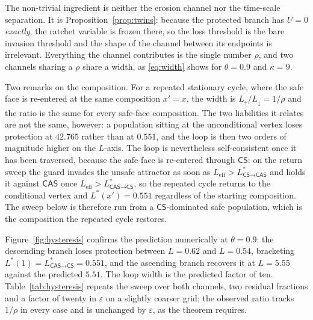 \documentclass[pdflatex]{sn-jnl}
\theoremstyle{thmstyleone}
\theoremstyle{thmstylethree}
\theoremstyle{thmstyletwo}
\newcommand{\CS}{\textsf{CS}}
\newcommand{\CAS}{\textsf{CAS}}
\begin{document}
The non-trivial ingredient is neither the erosion channel nor the time-scale
separation. It is Proposition~\ref{prop:twins}: because the protected branch
has $U=0$ \emph{exactly}, the ratchet variable is frozen there, so the loss
threshold is the bare invasion threshold and the shape of the channel between
its endpoints is irrelevant. Everything the channel contributes is the single
number $\rho$, and two channels sharing a $\rho$ share a width, as
\eqref{eq:width} shows for $\theta=0.9$ and $\kappa=9$.

Two remarks on the composition. For a repeated stationary cycle, where the
safe face is re-entered at the same composition $x'=x$, the width is
$L_{\uparrow}/L_{\downarrow}=1/\rho$ and the ratio is the same for every safe-face
composition. The two liabilities it relates are not the same, however: a
population sitting at the unconditional vertex loses protection at $42.765$
rather than at $0.551$, and the loop is then two orders of magnitude higher on
the $L$-axis. The loop is nevertheless self-consistent once it has been
traversed, because the safe face is re-entered through $\CS$: on the return
sweep the guard invades the unsafe attractor as soon as
$L_{\mathrm{eff}}>L^{*}_{\CS\to\CAS}$ and holds it against $\CAS$ once
$L_{\mathrm{eff}}>L^{*}_{\CAS\to\CS}$, so the repeated cycle returns to the
conditional vertex and $L^{*}(x')=0.551$ regardless of the starting
composition. The sweep below is therefore run from a $\CS$-dominated safe
population, which is the composition the repeated cycle restores.

Figure~\ref{fig:hysteresis} confirms the prediction numerically at
$\theta=0.9$: the descending branch loses protection between $L=0.62$ and
$L=0.54$, bracketing $L^{*}(1)=L^{*}_{\CAS\to\CS}=0.551$, and the ascending
branch recovers it at $L=5.55$ against the predicted $5.51$. The loop width is
the predicted factor of ten. Table~\ref{tab:hysteresis} repeats the sweep over
both channels, two residual fractions and a factor of twenty in $\varepsilon$
on a slightly coarser grid; the observed ratio tracks $1/\rho$ in every case
and is unchanged by $\varepsilon$, as the theorem requires.
\end{document}
